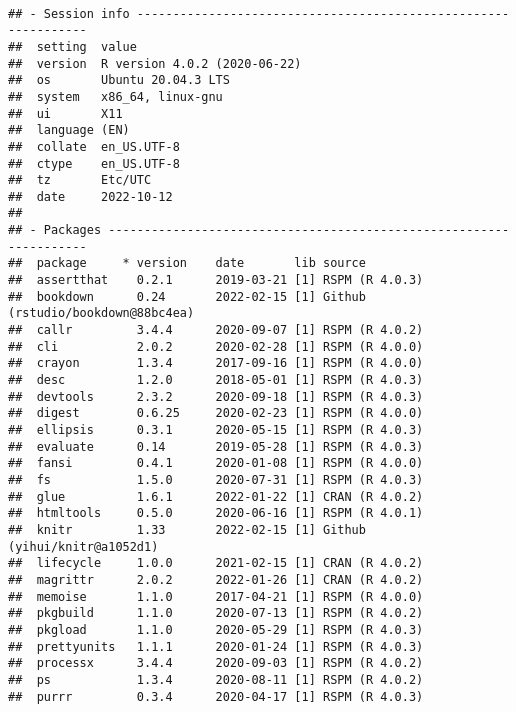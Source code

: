 \documentclass[
]{book}
\begin{document}
~

\begin{verbatim}
## - Session info ---------------------------------------------------------------
##  setting  value                       
##  version  R version 4.0.2 (2020-06-22)
##  os       Ubuntu 20.04.3 LTS          
##  system   x86_64, linux-gnu           
##  ui       X11                         
##  language (EN)                        
##  collate  en_US.UTF-8                 
##  ctype    en_US.UTF-8                 
##  tz       Etc/UTC                     
##  date     2022-10-12                  
## 
## - Packages -------------------------------------------------------------------
##  package     * version    date       lib source                            
##  assertthat    0.2.1      2019-03-21 [1] RSPM (R 4.0.3)                    
##  bookdown      0.24       2022-02-15 [1] Github (rstudio/bookdown@88bc4ea) 
##  callr         3.4.4      2020-09-07 [1] RSPM (R 4.0.2)                    
##  cli           2.0.2      2020-02-28 [1] RSPM (R 4.0.0)                    
##  crayon        1.3.4      2017-09-16 [1] RSPM (R 4.0.0)                    
##  desc          1.2.0      2018-05-01 [1] RSPM (R 4.0.3)                    
##  devtools      2.3.2      2020-09-18 [1] RSPM (R 4.0.3)                    
##  digest        0.6.25     2020-02-23 [1] RSPM (R 4.0.0)                    
##  ellipsis      0.3.1      2020-05-15 [1] RSPM (R 4.0.3)                    
##  evaluate      0.14       2019-05-28 [1] RSPM (R 4.0.3)                    
##  fansi         0.4.1      2020-01-08 [1] RSPM (R 4.0.0)                    
##  fs            1.5.0      2020-07-31 [1] RSPM (R 4.0.3)                    
##  glue          1.6.1      2022-01-22 [1] CRAN (R 4.0.2)                    
##  htmltools     0.5.0      2020-06-16 [1] RSPM (R 4.0.1)                    
##  knitr         1.33       2022-02-15 [1] Github (yihui/knitr@a1052d1)      
##  lifecycle     1.0.0      2021-02-15 [1] CRAN (R 4.0.2)                    
##  magrittr      2.0.2      2022-01-26 [1] CRAN (R 4.0.2)                    
##  memoise       1.1.0      2017-04-21 [1] RSPM (R 4.0.0)                    
##  pkgbuild      1.1.0      2020-07-13 [1] RSPM (R 4.0.2)                    
##  pkgload       1.1.0      2020-05-29 [1] RSPM (R 4.0.3)                    
##  prettyunits   1.1.1      2020-01-24 [1] RSPM (R 4.0.3)                    
##  processx      3.4.4      2020-09-03 [1] RSPM (R 4.0.2)                    
##  ps            1.3.4      2020-08-11 [1] RSPM (R 4.0.2)                    
##  purrr         0.3.4      2020-04-17 [1] RSPM (R 4.0.3)                    

\end{verbatim}
\end{document}
